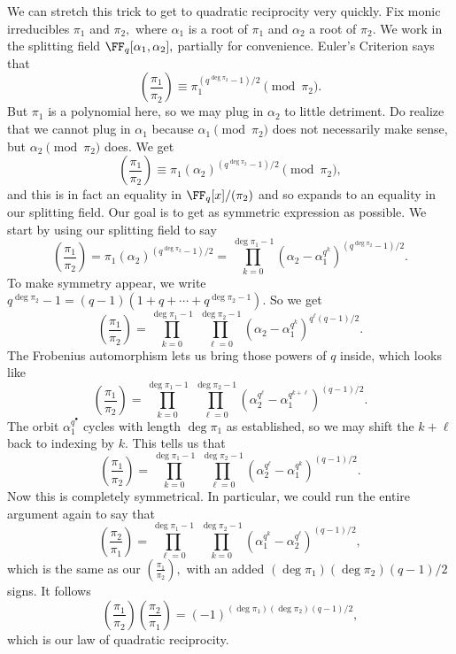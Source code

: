 We can stretch this trick to get to quadratic reciprocity very quickly. Fix monic irreducibles $\pi_1$ and $\pi_2,$ where $\alpha_1$ is a root of $\pi_1$ and $\alpha_2$ a root of $\pi_2.$ We work in the splitting field $\FF_q[\alpha_1,\alpha_2],$ partially for convenience. Euler's Criterion says that
\[\left(\frac{\pi_1}{\pi_2}\right)\equiv\pi_1^{\left(q^{\deg\pi_2}-1\right)/2}\pmod{\pi_2}.\]
But $\pi_1$ is a polynomial here, so we may plug in $\alpha_2$ to little detriment. Do realize that we cannot plug in $\alpha_1$ because $\alpha_1\pmod{\pi_2}$ does not necessarily make sense, but $\alpha_2\pmod{\pi_2}$ does. We get
\[\left(\frac{\pi_1}{\pi_2}\right)\equiv\pi_1(\alpha_2)^{\left(q^{\deg\pi_2}-1\right)/2}\pmod{\pi_2},\]
and this is in fact an equality in $\FF_q[x]/(\pi_2)$ and so expands to an equality in our splitting field. Our goal is to get as symmetric expression as possible. We start by using our splitting field to say
\[\left(\frac{\pi_1}{\pi_2}\right)=\pi_1(\alpha_2)^{\left(q^{\deg\pi_2}-1\right)/2}=\prod_{k=0}^{\deg\pi_1-1}\left(\alpha_2-\alpha_1^{q^k}\right)^{\left(q^{\deg\pi_2}-1\right)/2}.\]
To make symmetry appear, we write $q^{\deg\pi_2}-1=(q-1)\left(1+q+\cdots+q^{\deg\pi_2-1}\right).$ So we get
\[\left(\frac{\pi_1}{\pi_2}\right)=\prod_{k=0}^{\deg\pi_1-1}~\prod_{\ell=0}^{\deg\pi_2-1}\left(\alpha_2-\alpha_1^{q^k}\right)^{q^\ell(q-1)/2}.\]
The Frobenius automorphism lets us bring those powers of $q$ inside, which looks like
\[\left(\frac{\pi_1}{\pi_2}\right)=\prod_{k=0}^{\deg\pi_1-1}~\prod_{\ell=0}^{\deg\pi_2-1}\left(\alpha_2^{q^\ell}-\alpha_1^{q^{k+\ell}}\right)^{(q-1)/2}.\]
The orbit $\alpha_1^{q^\bullet}$ cycles with length $\deg\pi_1$ as established, so we may shift the $k+\ell$ back to indexing by $k.$ This tells us that
\[\left(\frac{\pi_1}{\pi_2}\right)=\prod_{k=0}^{\deg\pi_1-1}~\prod_{\ell=0}^{\deg\pi_2-1}\left(\alpha_2^{q^\ell}-\alpha_1^{q^k}\right)^{(q-1)/2}.\]
Now this is completely symmetrical. In particular, we could run the entire argument again to say that
\[\left(\frac{\pi_2}{\pi_1}\right)=\prod_{\ell=0}^{\deg\pi_1-1}~\prod_{k=0}^{\deg\pi_2-1}\left(\alpha_1^{q^k}-\alpha_2^{q^\ell}\right)^{(q-1)/2},\]
which is the same as our $\left(\frac{\pi_1}{\pi_2}\right),$ with an added $(\deg\pi_1)(\deg\pi_2)(q-1)/2$ signs. It follows
\[\left(\frac{\pi_1}{\pi_2}\right)\left(\frac{\pi_2}{\pi_1}\right)=(-1)^{(\deg\pi_1)(\deg\pi_2)(q-1)/2},\]
which is our law of quadratic reciprocity.

